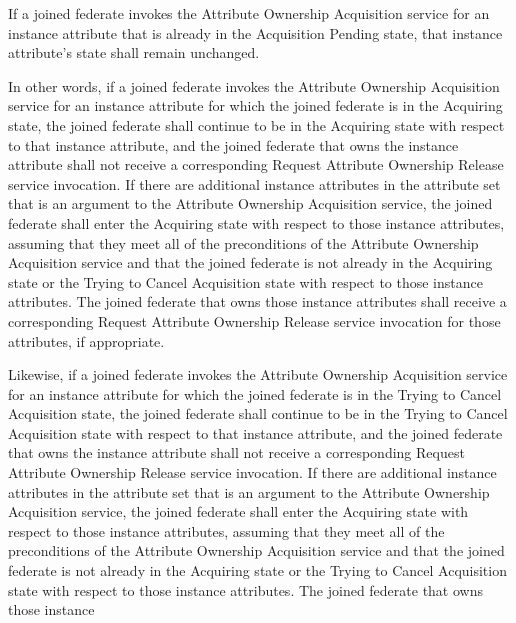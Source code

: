 \begin{compactstdpage}
    If a joined federate invokes the Attribute Ownership Acquisition service for an instance attribute that is already in the Acquisition Pending state, that instance attribute's state shall remain unchanged.


    In other words, if a joined federate invokes the Attribute Ownership Acquisition service for an instance attribute for which the joined federate is in the Acquiring state, the joined federate shall continue to be in the Acquiring state with respect to that instance attribute, and the joined federate that owns the instance attribute shall not receive a corresponding Request Attribute Ownership Release \rtiinitiated{} service invocation. If there are additional instance attributes in the attribute set that is an argument to the Attribute Ownership Acquisition service, the joined federate shall enter the Acquiring state with respect to those instance attributes, assuming that they meet all of the preconditions of the Attribute Ownership Acquisition service and that the joined federate is not already in the Acquiring state or the Trying to Cancel Acquisition state with respect to those instance attributes. The joined federate that owns those instance attributes shall receive a corresponding Request Attribute Ownership Release \rtiinitiated{} service invocation for those attributes, if appropriate.


    Likewise, if a joined federate invokes the Attribute Ownership Acquisition service for an instance attribute for which the joined federate is in the Trying to Cancel Acquisition state, the joined federate shall continue to be in the Trying to Cancel Acquisition state with respect to that instance attribute, and the joined federate that owns the instance attribute shall not receive a corresponding Request Attribute Ownership Release \rtiinitiated{} service invocation. If there are additional instance attributes in the attribute set that is an argument to the Attribute Ownership Acquisition service, the joined federate shall enter the Acquiring state with respect to those instance attributes, assuming that they meet all of the preconditions of the Attribute Ownership Acquisition service and that the joined federate is not already in the Acquiring state or the Trying to Cancel Acquisition state with respect to those instance attributes. The joined federate that owns those instance

\end{compactstdpage}

\clearpage

